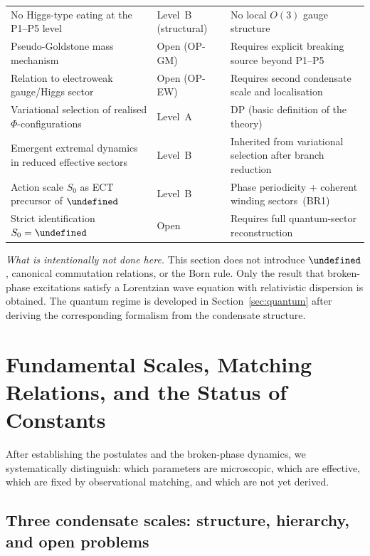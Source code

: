 \documentclass[11pt,a4paper]{article}
\let\hbar\undefined
\numberwithin{equation}{section}
\begin{document}
\begin{center}
\begin{tabular}{p{5.5cm}p{3.5cm}p{4.0cm}}
No Higgs-type eating at the P1--P5 level
  & Level~B (structural) & No local $O(3)$ gauge structure \\
Pseudo-Goldstone mass mechanism
  & Open (OP-GM) & Requires explicit breaking source beyond P1--P5 \\
Relation to electroweak gauge/Higgs sector
  & Open (OP-EW) & Requires second condensate scale and localisation \\
Variational selection of realised $\Phi$-configurations
  & Level~A & DP (basic definition of the theory) \\
Emergent extremal dynamics in reduced effective sectors
  & Level~B & Inherited from variational selection after branch reduction \\
Action scale $S_0$ as ECT precursor of $\hbar$
  & Level~B & Phase periodicity + coherent winding sectors~(BR1) \\
Strict identification $S_0=\hbar$
  & Open & Requires full quantum-sector reconstruction \\
\hline\hline
\end{tabular}
\end{center}

\medskip
\noindent\textit{What is intentionally not done here.}
This section does not introduce $\hbar$, canonical commutation relations,
or the Born rule. Only the result that broken-phase excitations satisfy
a Lorentzian wave equation with relativistic dispersion is obtained.
The quantum regime is developed in Section~\ref{sec:quantum}
after deriving the corresponding formalism from the condensate structure.


\section{Fundamental Scales, Matching Relations, and the Status of Constants}
\label{sec:constants}

After establishing the postulates and the broken-phase dynamics,
we systematically distinguish: which parameters are microscopic,
which are effective, which are fixed by observational matching,
and which are not yet derived.


\subsection{Three condensate scales: structure, hierarchy, and open problems}
\label{sec:three_scales}
\end{document}
